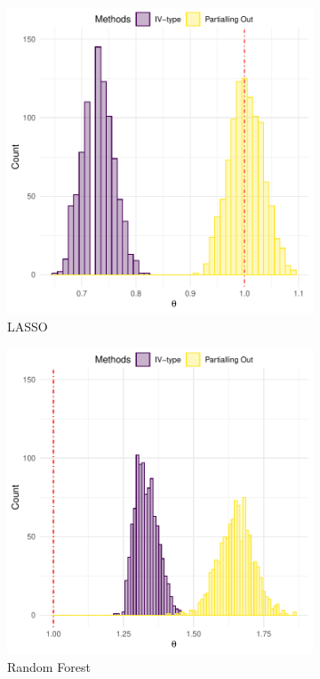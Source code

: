 \documentclass[en,mtpro2]{elegantpaper}
\begin{document}
\begin{figure}[htpb]
    \centering
    \begin{subfigure}{.45\textwidth}
        \centering
        \includegraphics[width=\linewidth]{figures/intution-iv-type-vs-partialling-out-lasso.pdf}
        \caption{LASSO}
    \end{subfigure}
    \begin{subfigure}{.45\textwidth}
        \centering
        \includegraphics[width=\linewidth]{figures/intution-iv-type-vs-partialling-out-rf.pdf}
        \caption{Random Forest}
    \end{subfigure}
    \caption{}
\end{figure}
\end{document}
